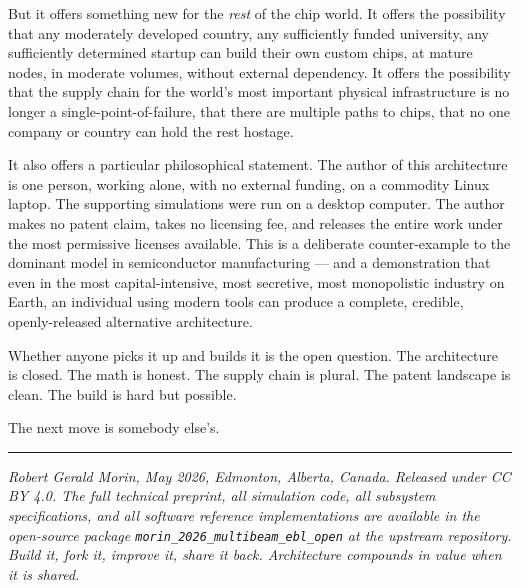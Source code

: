 \documentclass[11pt,letterpaper]{article}
\begin{document}
But it offers something new for the \emph{rest} of the chip world. It offers the possibility that any moderately developed country, any sufficiently funded university, any sufficiently determined startup can build their own custom chips, at mature nodes, in moderate volumes, without external dependency. It offers the possibility that the supply chain for the world's most important physical infrastructure is no longer a single-point-of-failure, that there are multiple paths to chips, that no one company or country can hold the rest hostage.

It also offers a particular philosophical statement. The author of this architecture is one person, working alone, with no external funding, on a commodity Linux laptop. The supporting simulations were run on a desktop computer. The author makes no patent claim, takes no licensing fee, and releases the entire work under the most permissive licenses available. This is a deliberate counter-example to the dominant model in semiconductor manufacturing --- and a demonstration that even in the most capital-intensive, most secretive, most monopolistic industry on Earth, an individual using modern tools can produce a complete, credible, openly-released alternative architecture.

Whether anyone picks it up and builds it is the open question. The architecture is closed. The math is honest. The supply chain is plural. The patent landscape is clean. The build is hard but possible.

The next move is somebody else's.

\bigskip\hrule\bigskip

\noindent\textit{Robert Gerald Morin, May 2026, Edmonton, Alberta, Canada. Released under CC BY 4.0. The full technical preprint, all simulation code, all subsystem specifications, and all software reference implementations are available in the open-source package \texttt{morin\_2026\_multibeam\_ebl\_open} at the upstream repository. Build it, fork it, improve it, share it back. Architecture compounds in value when it is shared.}
\end{document}
